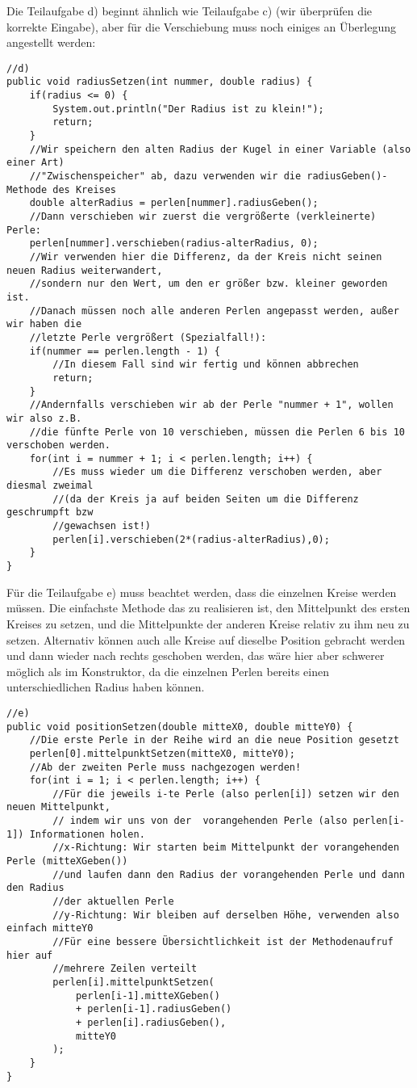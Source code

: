 \documentclass{article}
\begin{document}
Die Teilaufgabe d) beginnt ähnlich wie Teilaufgabe c) (wir überprüfen die korrekte Eingabe), aber für die Verschiebung muss noch einiges an Überlegung angestellt werden:
\begin{verbatim}
//d)
public void radiusSetzen(int nummer, double radius) {
    if(radius <= 0) {
        System.out.println("Der Radius ist zu klein!");
        return;
    }
    //Wir speichern den alten Radius der Kugel in einer Variable (also einer Art) 
    //"Zwischenspeicher" ab, dazu verwenden wir die radiusGeben()-Methode des Kreises
    double alterRadius = perlen[nummer].radiusGeben();
    //Dann verschieben wir zuerst die vergrößerte (verkleinerte) Perle:
    perlen[nummer].verschieben(radius-alterRadius, 0);
    //Wir verwenden hier die Differenz, da der Kreis nicht seinen neuen Radius weiterwandert,
    //sondern nur den Wert, um den er größer bzw. kleiner geworden ist. 
    //Danach müssen noch alle anderen Perlen angepasst werden, außer wir haben die 
    //letzte Perle vergrößert (Spezialfall!):
    if(nummer == perlen.length - 1) {
        //In diesem Fall sind wir fertig und können abbrechen
        return;
    }
    //Andernfalls verschieben wir ab der Perle "nummer + 1", wollen wir also z.B.
    //die fünfte Perle von 10 verschieben, müssen die Perlen 6 bis 10 verschoben werden.
    for(int i = nummer + 1; i < perlen.length; i++) {
        //Es muss wieder um die Differenz verschoben werden, aber diesmal zweimal
        //(da der Kreis ja auf beiden Seiten um die Differenz geschrumpft bzw
        //gewachsen ist!)
        perlen[i].verschieben(2*(radius-alterRadius),0);
    }
}
\end{verbatim}
Für die Teilaufgabe e) muss beachtet werden, dass die einzelnen Kreise  werden müssen. Die einfachste Methode das zu realisieren ist, den Mittelpunkt des ersten Kreises zu setzen, und die Mittelpunkte der anderen Kreise relativ zu ihm neu zu setzen. Alternativ können auch alle Kreise auf dieselbe Position gebracht werden und dann wieder nach rechts geschoben werden, das wäre hier aber schwerer möglich als im Konstruktor, da die einzelnen Perlen bereits einen unterschiedlichen Radius haben können. 
\begin{verbatim}
//e)
public void positionSetzen(double mitteX0, double mitteY0) {
    //Die erste Perle in der Reihe wird an die neue Position gesetzt
    perlen[0].mittelpunktSetzen(mitteX0, mitteY0);
    //Ab der zweiten Perle muss nachgezogen werden!
    for(int i = 1; i < perlen.length; i++) {
        //Für die jeweils i-te Perle (also perlen[i]) setzen wir den neuen Mittelpunkt,
        // indem wir uns von der  vorangehenden Perle (also perlen[i-1]) Informationen holen.
        //x-Richtung: Wir starten beim Mittelpunkt der vorangehenden Perle (mitteXGeben()) 
        //und laufen dann den Radius der vorangehenden Perle und dann den Radius
        //der aktuellen Perle
        //y-Richtung: Wir bleiben auf derselben Höhe, verwenden also einfach mitteY0
        //Für eine bessere Übersichtlichkeit ist der Methodenaufruf hier auf 
        //mehrere Zeilen verteilt
        perlen[i].mittelpunktSetzen(
            perlen[i-1].mitteXGeben() 
            + perlen[i-1].radiusGeben()
            + perlen[i].radiusGeben(),
            mitteY0
        );
    }
}
\end{verbatim}
\end{document}
